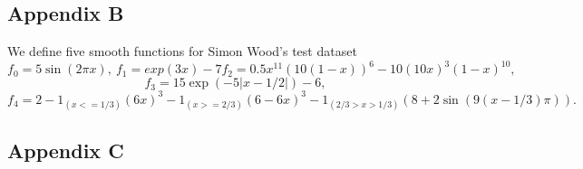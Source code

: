 \hypertarget{appendix-b}{%
\subsection{Appendix B}\label{appendix-b}}

We define five smooth functions for Simon Wood's test dataset \[
f_0=5\sin(2\pi x),~
f_1=exp(3x)-7
f_2=0.5 x^{11}(10(1 - x))^6 - 10 (10x)^3(1 - x)^{10},~
\] \[
f_3=15 \exp(-5 |x-1/2|)-6,
\] \[
f_4=2-1_{(x <= 1/3)}(6x)^3 - 1_{(x >= 2/3)} (6-6x)^3 - 
1_{(2/3 > x > 1/3)}(8+2\sin(9(x-1/3)\pi)).
\]

\hypertarget{appendix-c}{%
\subsection{Appendix C}\label{appendix-c}}

